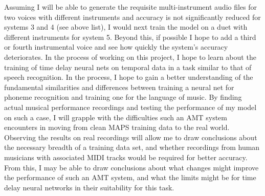 \documentclass[conference]{IEEEtran}
\begin{document}
Assuming I will be able to generate the requisite multi-instrument audio files for two voices with different instruments and accuracy is not significantly reduced for systems 3 and 4 (see above list), I would next train the model on a duet with different instruments for system 5. Beyond this, if possible I hope to add a third or fourth instrumental voice and see how quickly the system's accuracy deteriorates. In the process of working on this project, I hope to learn about the training of time delay neural nets on temporal data in a task similar to that of speech recognition. In the process, I hope to gain a better understanding of the fundamental similarities and differences between training a neural net for phoneme recognition and training one for the language of music. By finding actual musical performance recordings and testing the performance of my model on such a case, I will grapple with the difficulties such an AMT system encounters in moving from clean MAPS training data to the real world. Observing the results on real recordings will allow me to draw conclusions about the necessary breadth of a training data set, and whether recordings from human musicians with associated MIDI tracks would be required for better accuracy. From this, I may be able to draw conclusions about what changes might improve the performance of such an AMT system, and what the limits might be for time delay neural networks in their suitability for this task.




\end{document}
